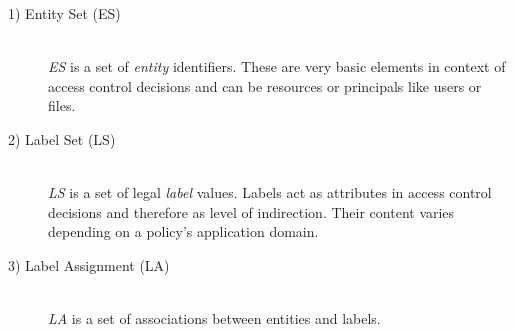 \documentclass[twoside, openright, 12pt]{book}
\begin{document}
\begin{description}
\item[1) Entity Set (ES)]\hfill \\
\textit{ES} is a set of \textit{entity} identifiers.
These are very basic elements in context of access control decisions and can be resources or principals like users or files.


\item[2) Label Set (LS)]\hfill \\
\textit{LS} is a set of legal \textit{label} values.
Labels act as attributes in access control decisions and therefore as level of indirection.
Their content varies depending on a policy's application domain.


\item[3) Label Assignment (LA)]\hfill \\
\textit{LA} is a set of associations between entities and labels.



\end{description}
\end{document}
